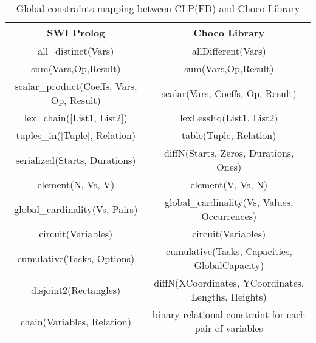 \begin{table}[ht]
    \begin{center}
        \resizebox{14cm}{!} 
        { 
        \begin{tabular}{||c c||} 
        \hline
        SWI Prolog & Choco Library \\ [0.5ex] 
        \hline\hline
        all\_distinct(Vars) & allDifferent(Vars) \\ 
        \hline
        sum(Vars,Op,Result) & sum(Vars,Op,Result) \\
        \hline
        scalar\_product(Coeffs, Vars, Op, Result) & scalar(Vars, Coeffs, Op, Result)\\
        \hline
        lex\_chain([List1, List2]) & lexLessEq(List1, List2) \\
        \hline
        tuples\_in([Tuple], Relation) & table(Tuple, Relation) \\
        \hline
        serialized(Starts, Durations) & diffN(Starts, Zeros, Durations, Ones) \\
        \hline
        element(N, Vs, V) & element(V, Vs, N) \\
        \hline
        global\_cardinality(Vs, Pairs) & global\_cardinality(Vs, Values, Occurrences) \\
        \hline
        circuit(Variables) & circuit(Variables) \\
        \hline
        cumulative(Tasks, Options) & cumulative(Tasks, Capacities, GlobalCapacity) \\
        \hline
        disjoint2(Rectangles) & diffN(XCoordinates, YCoordinates, Lengths, Heights) \\
        \hline
        chain(Variables, Relation) & binary relational constraint for each pair of variables \\
        \hline
        \end{tabular}
        \label{table:global_mapping}
        }
        \caption{Global constraints mapping between CLP(FD) and Choco Library}
    \end{center}  
\end{table}    

